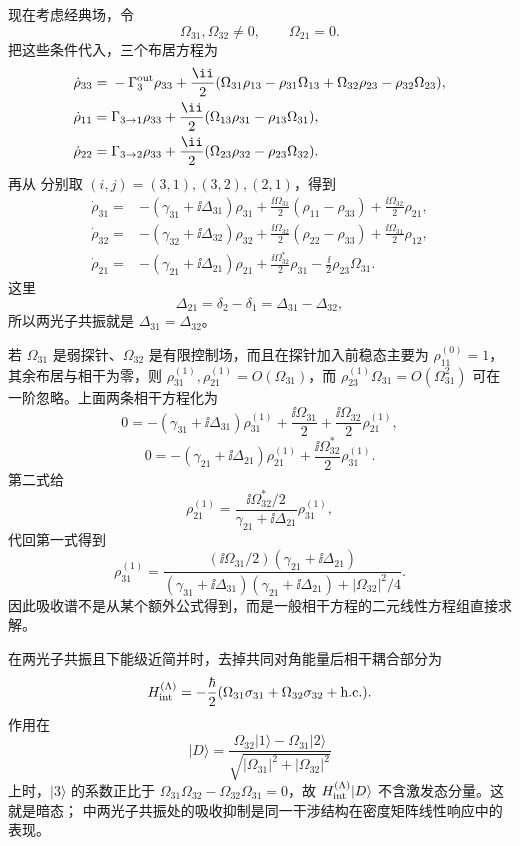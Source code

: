 \begin{exbox}[$\Lambda$ 型]
现在考虑经典场，令
\[
\Omega_{31},\Omega_{32}\ne0,
\qquad
\Omega_{21}=0.
\]
把这些条件代入，三个布居方程为
\begin{align}
\dot\rho_{33}
={}&-\Gamma_3^{\rm out}\rho_{33}
+\frac{\ii}{2}
(\Omega_{31}\rho_{13}-\rho_{31}\Omega_{13}
+\Omega_{32}\rho_{23}-\rho_{32}\Omega_{23}),\\
\dot\rho_{11}
={}&\Gamma_{3\to1}\rho_{33}
+\frac{\ii}{2}(\Omega_{13}\rho_{31}-\rho_{13}\Omega_{31}),\\
\dot\rho_{22}
={}&\Gamma_{3\to2}\rho_{33}
+\frac{\ii}{2}(\Omega_{23}\rho_{32}-\rho_{23}\Omega_{32}).
\end{align}
再从 分别取 $(i,j)=(3,1),(3,2),(2,1)$，得到
\begin{align}
\dot\rho_{31}
={}&-(\gamma_{31}+\ii\Delta_{31})\rho_{31}
+\frac{\ii\Omega_{31}}2(\rho_{11}-\rho_{33})
+\frac{\ii\Omega_{32}}2\rho_{21},\\
\dot\rho_{32}
={}&-(\gamma_{32}+\ii\Delta_{32})\rho_{32}
+\frac{\ii\Omega_{32}}2(\rho_{22}-\rho_{33})
+\frac{\ii\Omega_{31}}2\rho_{12},\\
\dot\rho_{21}
={}&-(\gamma_{21}+\ii\Delta_{21})\rho_{21}
+\frac{\ii\Omega_{32}^*}{2}\rho_{31}
-\frac{\ii}{2}\rho_{23}\Omega_{31}.
\end{align}
这里
\[
\Delta_{21}=\delta_2-\delta_1=\Delta_{31}-\Delta_{32},
\]
所以两光子共振就是 $\Delta_{31}=\Delta_{32}$。

若 $\Omega_{31}$ 是弱探针、$\Omega_{32}$ 是有限控制场，而且在探针加入前稳态主要为 $\rho_{11}^{(0)}=1$，其余布居与相干为零，则 $\rho_{31}^{(1)},\rho_{21}^{(1)}=O(\Omega_{31})$，而 $\rho_{23}^{(1)}\Omega_{31}=O(\Omega_{31}^2)$ 可在一阶忽略。上面两条相干方程化为
\[
0=-(\gamma_{31}+\ii\Delta_{31})\rho_{31}^{(1)}
+\frac{\ii\Omega_{31}}2
+\frac{\ii\Omega_{32}}2\rho_{21}^{(1)},
\]
\[
0=-(\gamma_{21}+\ii\Delta_{21})\rho_{21}^{(1)}
+\frac{\ii\Omega_{32}^*}{2}\rho_{31}^{(1)}.
\]
第二式给
\[
\rho_{21}^{(1)}
=\frac{\ii\Omega_{32}^*/2}{\gamma_{21}+\ii\Delta_{21}}\rho_{31}^{(1)},
\]
代回第一式得到
\begin{equation}
\rho_{31}^{(1)}
=\frac{(\ii\Omega_{31}/2)(\gamma_{21}+\ii\Delta_{21})}
{(\gamma_{31}+\ii\Delta_{31})(\gamma_{21}+\ii\Delta_{21})
+|\Omega_{32}|^2/4}.
\label{eq:phys-oqs-lambda-response}
\end{equation}
因此吸收谱不是从某个额外公式得到，而是一般相干方程的二元线性方程组直接求解。

在两光子共振且下能级近简并时，去掉共同对角能量后相干耦合部分为
\[
H_{\rm int}^{(\Lambda)}
=-\frac{\hbar}{2}
(\Omega_{31}\sigma_{31}+\Omega_{32}\sigma_{32}+\mathrm{h.c.}).
\]
作用在
\[
|D\rangle
=\frac{\Omega_{32}|1\rangle-\Omega_{31}|2\rangle}
{\sqrt{|\Omega_{31}|^2+|\Omega_{32}|^2}}
\]
上时，$|3\rangle$ 的系数正比于
$\Omega_{31}\Omega_{32}-\Omega_{32}\Omega_{31}=0$，故 $H_{\rm int}^{(\Lambda)}|D\rangle$ 不含激发态分量。这就是暗态； 中两光子共振处的吸收抑制是同一干涉结构在密度矩阵线性响应中的表现。
\end{exbox}

